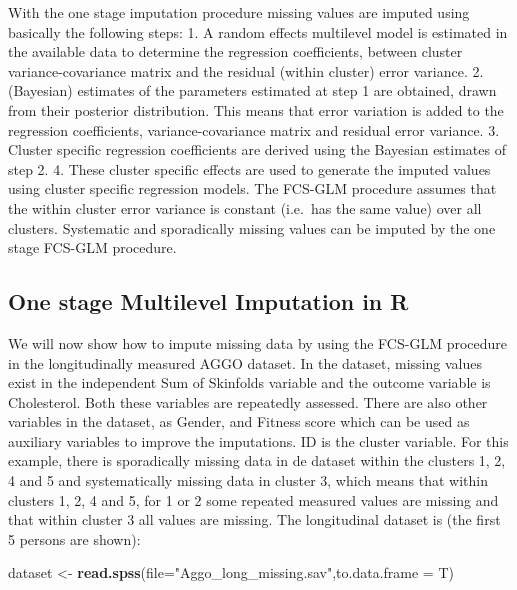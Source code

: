 \documentclass[]{book}
\newenvironment{Shaded}{\begin{snugshade}}{\end{snugshade}}
\newcommand{\KeywordTok}[1]{\textcolor[rgb]{0.13,0.29,0.53}{\textbf{#1}}}
\newcommand{\DataTypeTok}[1]{\textcolor[rgb]{0.13,0.29,0.53}{#1}}
\newcommand{\StringTok}[1]{\textcolor[rgb]{0.31,0.60,0.02}{#1}}
\newcommand{\NormalTok}[1]{#1}
\theoremstyle{definition}
\theoremstyle{definition}
\theoremstyle{definition}
\theoremstyle{remark}
\begin{document}
With the one stage imputation procedure missing values are imputed using
basically the following steps: 1. A random effects multilevel model is
estimated in the available data to determine the regression
coefficients, between cluster variance-covariance matrix and the
residual (within cluster) error variance. 2. (Bayesian) estimates of the
parameters estimated at step 1 are obtained, drawn from their posterior
distribution. This means that error variation is added to the regression
coefficients, variance-covariance matrix and residual error variance. 3.
Cluster specific regression coefficients are derived using the Bayesian
estimates of step 2. 4. These cluster specific effects are used to
generate the imputed values using cluster specific regression models.
The FCS-GLM procedure assumes that the within cluster error variance is
constant (i.e.~has the same value) over all clusters. Systematic and
sporadically missing values can be imputed by the one stage FCS-GLM
procedure.

\subsection{One stage Multilevel Imputation in
R}\label{one-stage-multilevel-imputation-in-r}

We will now show how to impute missing data by using the FCS-GLM
procedure in the longitudinally measured AGGO dataset. In the dataset,
missing values exist in the independent Sum of Skinfolds variable and
the outcome variable is Cholesterol. Both these variables are repeatedly
assessed. There are also other variables in the dataset, as Gender, and
Fitness score which can be used as auxiliary variables to improve the
imputations. ID is the cluster variable. For this example, there is
sporadically missing data in de dataset within the clusters 1, 2, 4 and
5 and systematically missing data in cluster 3, which means that within
clusters 1, 2, 4 and 5, for 1 or 2 some repeated measured values are
missing and that within cluster 3 all values are missing. The
longitudinal dataset is (the first 5 persons are shown):

\begin{Shaded}
\begin{Highlighting}[]
\NormalTok{dataset <-}\StringTok{ }\KeywordTok{read.spss}\NormalTok{(}\DataTypeTok{file=}\StringTok{"Aggo_long_missing.sav"}\NormalTok{,}\DataTypeTok{to.data.frame =}\NormalTok{ T)}
\end{Highlighting}
\end{Shaded}
\end{document}
